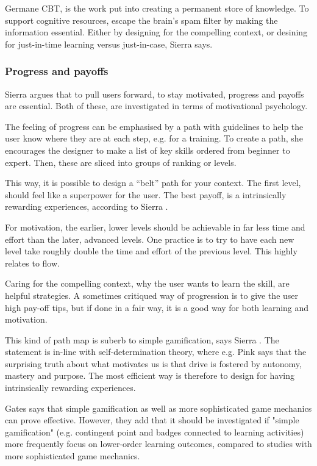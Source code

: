 Germane CBT, is the work put into creating a permanent store of knowledge. To support cognitive resources, escape the brain's spam filter by making the information essential. Either by designing for the compelling context, or desining for just-in-time learning versus just-in-case, Sierra says. \cite{sierra}

\subsubsection{Progress and payoffs}

Sierra argues that to pull users forward, to stay motivated, progress and payoffs are essential. Both of these, are investigated in terms of motivational psychology.

The feeling of progress can be emphasised by a path with guidelines to help the user know where they are at each step, e.g. for a training. To create a path, she encourages the designer to make a list of key skills ordered from beginner to expert. Then, these are sliced into groups of ranking or levels.

This way, it is possible to design a “belt” path for your context. The first level, should feel like a superpower for the user. The best payoff, is a intrinsically rewarding experiences, according to Sierra \cite{sierra}.

For motivation, the earlier, lower levels should be achievable in far less time and effort than the later, advanced levels. One practice is to try to have each new level take roughly double the time and effort of the previous level. This highly relates to flow.

Caring for the compelling context, why the user wants to learn the skill, are helpful strategies. A sometimes critiqued way of progression is to give the user high pay-off tips, but if done in a fair way, it is a good way for both learning and motivation.

This kind of path map is suberb to simple gamification, says Sierra \cite{sierra}. The statement is in-line with self-determination theory, where e.g. Pink \cite{pink} says that the surprising truth about what motivates us is that drive is fostered by autonomy, mastery and purpose. The most efficient way is therefore to design for having intrinsically rewarding experiences.

Gates \cite{sierra} says that simple gamification as well as more sophisticated game mechanics can prove effective. However, they add that it should be investigated if "simple gamification" (e.g. contingent point and badges connected to learning activities) more frequently focus on lower-order learning outcomes, compared to studies with more sophisticated game mechanics.
